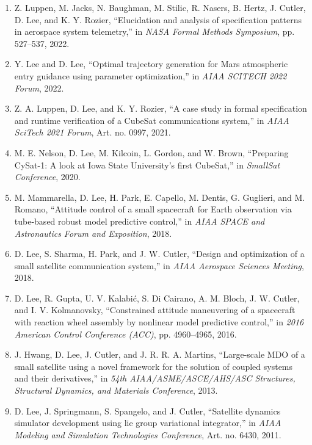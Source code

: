 \begin{enumerate}
  \item Z. Luppen, M. Jacks, N. Baughman, M. Stilic, R. Nasers, B. Hertz, J. Cutler, D. Lee, and K. Y. Rozier, ``Elucidation and analysis of specification patterns in aerospace system telemetry,'' in \textit{NASA Formal Methods Symposium}, pp. 527--537, 2022.
  \item Y. Lee and D. Lee, ``Optimal trajectory generation for Mars atmospheric entry guidance using parameter optimization,'' in \textit{AIAA SCITECH 2022 Forum}, 2022.
  \item Z. A. Luppen, D. Lee, and K. Y. Rozier, ``A case study in formal specification and runtime verification of a CubeSat communications system,'' in \textit{AIAA SciTech 2021 Forum}, Art. no. 0997, 2021.
  \item M. E. Nelson, D. Lee, M. Kilcoin, L. Gordon, and W. Brown, ``Preparing CySat-1: A look at Iowa State University's first CubeSat,'' in \textit{SmallSat Conference}, 2020.
  \item M. Mammarella, D. Lee, H. Park, E. Capello, M. Dentis, G. Guglieri, and M. Romano, ``Attitude control of a small spacecraft for Earth observation via tube-based robust model predictive control,'' in \textit{AIAA SPACE and Astronautics Forum and Exposition}, 2018.
  \item D. Lee, S. Sharma, H. Park, and J. W. Cutler, ``Design and optimization of a small satellite communication system,'' in \textit{AIAA Aerospace Sciences Meeting}, 2018.
  \item D. Lee, R. Gupta, U. V. Kalabi\'{c}, S. Di Cairano, A. M. Bloch, J. W. Cutler, and I. V. Kolmanovsky, ``Constrained attitude maneuvering of a spacecraft with reaction wheel assembly by nonlinear model predictive control,'' in \textit{2016 American Control Conference (ACC)}, pp. 4960--4965, 2016.
  \item J. Hwang, D. Lee, J. Cutler, and J. R. R. A. Martins, ``Large-scale MDO of a small satellite using a novel framework for the solution of coupled systems and their derivatives,'' in \textit{54th AIAA/ASME/ASCE/AHS/ASC Structures, Structural Dynamics, and Materials Conference}, 2013.
  \item D. Lee, J. Springmann, S. Spangelo, and J. Cutler, ``Satellite dynamics simulator development using lie group variational integrator,'' in \textit{AIAA Modeling and Simulation Technologies Conference}, Art. no. 6430, 2011.
\end{enumerate}

